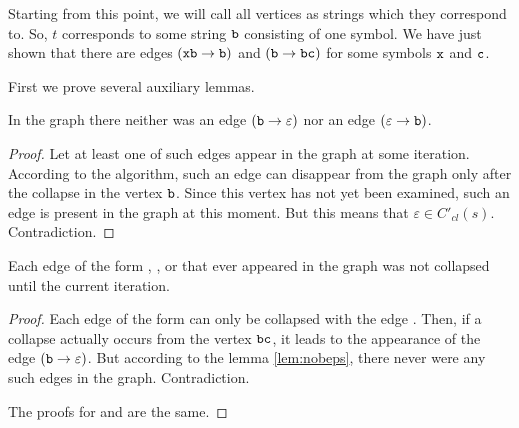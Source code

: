 Starting from this point, we will call all vertices as strings which they correspond to. So, $ t $ corresponds to some string $ \tt b $ consisting of one symbol. We have just shown that there are edges $ ({\tt xb} \to {\tt b}) $ and $ ({\tt b} \to {\tt bc}) $ for some symbols $ {\tt x} $ and $ {\tt c} $.

First we prove several auxiliary lemmas.

\begin{lemma}
\label{lem:nobeps}
In the graph there neither was an edge $ ({\tt b} \to \varepsilon) $ nor an edge $ (\varepsilon \to {\tt b}) $.
\end{lemma}
\begin{proof}
Let at least one of such edges appear in the graph at some iteration. According to the algorithm, such an edge can disappear from the graph only after the collapse in the vertex $ {\tt b} $. Since this vertex has not yet been examined, such an edge is present in the graph at this moment. But this means that $ \varepsilon \in C'_{cl} (s) $. Contradiction.
\end{proof}

\begin{lemma}
\label{lem:bccsave}
Each edge of the form , , or  that ever appeared in the graph was not collapsed until the current iteration.
\end{lemma}
\begin{proof}
Each edge of the form  can only be collapsed with the edge . Then, if a collapse actually occurs from the vertex $ {\tt bc} $, it leads to the appearance of the edge $ ({\tt b} \to \varepsilon) $. But according to the lemma \ref{lem:nobeps}, there never were any such edges in the graph. Contradiction.

The proofs for  and  are the same.
\end{proof}

